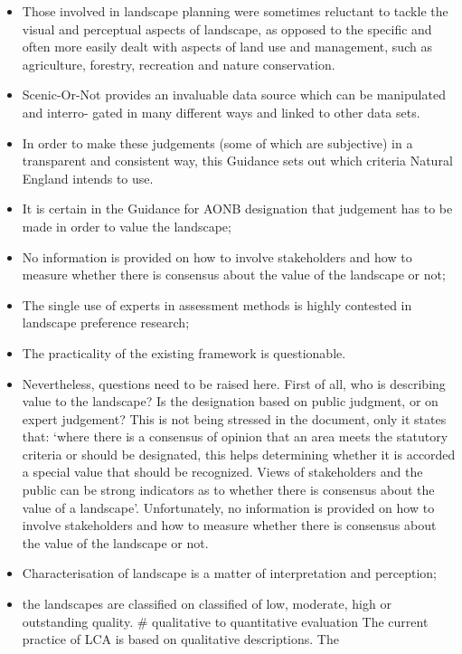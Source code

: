 \documentclass[]{elsarticle} %
\begin{document}
\begin{itemize}
\item
  Those involved in landscape planning were sometimes reluctant to
  tackle the visual and perceptual aspects of landscape, as opposed to
  the specific and often more easily dealt with aspects of land use and
  management, such as agriculture, forestry, recreation and nature
  conservation.
\item
  Scenic-Or-Not provides an invaluable data source which can be
  manipulated and interro- gated in many different ways and linked to
  other data sets.
\item
  In order to make these judgements (some of which are subjective) in a
  transparent and consistent way, this Guidance sets out which criteria
  Natural England intends to use.
\item
  It is certain in the Guidance for AONB designation that judgement has
  to be made in order to value the landscape;
\item
  No information is provided on how to involve stakeholders and how to
  measure whether there is consensus about the value of the landscape or
  not;
\item
  The single use of experts in assessment methods is highly contested in
  landscape preference research;
\item
  The practicality of the existing framework is questionable.
\item
  Nevertheless, questions need to be raised here. First of all, who is
  describing value to the landscape? Is the designation based on public
  judgment, or on expert judgement? This is not being stressed in the
  document, only it states that: `where there is a consensus of opinion
  that an area meets the statutory criteria or should be designated,
  this helps determining whether it is accorded a special value that
  should be recognized. Views of stakeholders and the public can be
  strong indicators as to whether there is consensus about the value of
  a landscape'. Unfortunately, no information is provided on how to
  involve stakeholders and how to measure whether there is consensus
  about the value of the landscape or not.
\item
  Characterisation of landscape is a matter of interpretation and
  perception;
\item
  the landscapes are classified on classified of low, moderate, high or
  outstanding quality. \# qualitative to quantitative evaluation The
  current practice of LCA is based on qualitative descriptions. The

\end{itemize}
\end{document}
